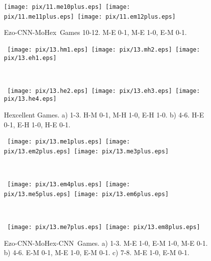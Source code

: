 \documentclass{article}
\def\Ec{\mbox{\sc Ezo-CNN}}
\def\Hent{\mbox{\sc Hexcellent}}
\def\Mx{\mbox{\sc MoHex}}
\def\Mc{\mbox{\sc MoHex-CNN}}
\begin{document}
\newpage
\begin{figure}[hbp]
\noindent
\texttt{[image: pix/11.me10plus.eps]}\hspace*{-1cm}\
\texttt{[image: pix/11.me11plus.eps]}\hspace*{-1cm}\
\texttt{[image: pix/11.em12plus.eps]}
\caption{\Ec-\Mx\ Games 10-12. M-E 0-1, M-E 1-0, E-M 0-1.}
\end{figure}

\begin{figure}[hbp]
\noindent\hspace*{-.4cm}\
\texttt{[image: pix/13.hm1.eps]}\hspace*{-1cm}\
\texttt{[image: pix/13.mh2.eps]}\hspace*{-1cm}\
\texttt{[image: pix/13.eh1.eps]}

~

\noindent\hspace*{-.4cm}\
\texttt{[image: pix/13.he2.eps]}\hspace*{-1cm}\
\texttt{[image: pix/13.eh3.eps]}\hspace*{-1cm}\
\texttt{[image: pix/13.he4.eps]}
\caption{\Hent{} Games.  a) 1-3. H-M 0-1, M-H 1-0, E-H 1-0.
b) 4-6. H-E 0-1, E-H 1-0, H-E 0-1.}
\end{figure}

\begin{figure}[hbp]
\noindent\hspace*{-.4cm}\
\texttt{[image: pix/13.me1plus.eps]}\hspace*{-1cm}\
\texttt{[image: pix/13.em2plus.eps]}\hspace*{-1cm}\
\texttt{[image: pix/13.me3plus.eps]}

~

\noindent\hspace*{-.4cm}\
\texttt{[image: pix/13.em4plus.eps]}\hspace*{-1cm}\
\texttt{[image: pix/13.me5plus.eps]}\hspace*{-1cm}\
\texttt{[image: pix/13.em6plus.eps]}\

~

\noindent\hspace*{-.4cm}\
\texttt{[image: pix/13.me7plus.eps]}\hspace*{-1cm}\
\texttt{[image: pix/13.em8plus.eps]}
\caption{\Ec{}-\Mc\ Games. 
a) 1-3. M-E 1-0, E-M 1-0, M-E 0-1.
b) 4-6. E-M 0-1, M-E 1-0, E-M 0-1.
c) 7-8. M-E 1-0, E-M 0-1.}
\label{fig:EM13}
\end{figure}
\end{document}
